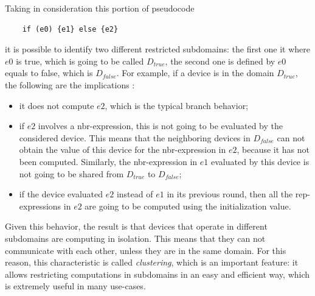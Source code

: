 Taking in consideration this portion of pseudocode
\begin{lstlisting}
    if (e0) {e1} else {e2}
\end{lstlisting}
it is possible to identify two different restricted subdomains: the first one it where $e0$ is true, which is going to be called $D_{true}$, the second one is defined by $e0$ equals to false, which is $D_{false}$.
For example, if a device is in the domain $D_{true}$, the following are the implications \cite{computational_fields_theory}:
\begin{itemize}
    \item it does not compute $e2$, which is the typical branch behavior;
    \item if $e2$ involves a nbr-expression, this is not going to be evaluated by the considered device. This means that the neighboring devices in $D_{false}$ can not obtain the value of this device for the nbr-expression in $e2$, because it has not been computed. Similarly, the nbr-expression in $e1$ evaluated by this device is not going to be shared from $D_{true}$ to $D_{false}$;
    \item if the device evaluated $e2$ instead of $e1$ in its previous round, then all the rep-expressions in $e2$ are going to be computed using the initialization value.
\end{itemize}

Given this behavior, the result is that devices that operate in different subdomains are computing in isolation. This means that they can not communicate with each other, unless they are in the same domain. For this reason, this characteristic is called \textit{clustering}, which is an important feature: it allows restricting computations in subdomains in an easy and efficient way, which is extremely useful in many use-cases.

